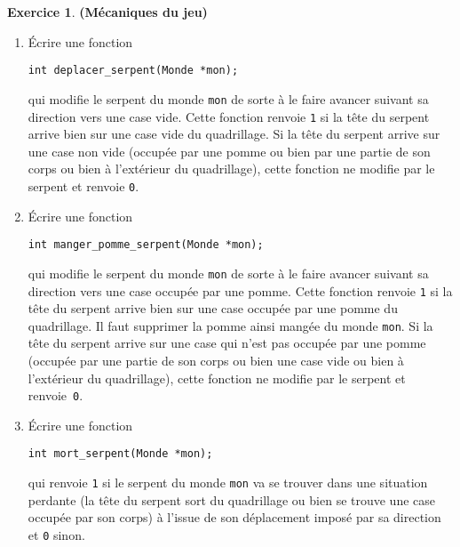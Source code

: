 \documentclass[11pt]{article}
\theoremstyle{definition}
\newtheorem{Exercice}{Exercice}
\begin{document}
\begin{Exercice} {\bf (Mécaniques du jeu)}
\begin{enumerate}
    \item Écrire une fonction
\begin{lstlisting}
int deplacer_serpent(Monde *mon);
\end{lstlisting}
    qui modifie le serpent du monde {\tt mon} de sorte à le faire avancer
    suivant sa direction vers une case vide. Cette fonction renvoie {\tt 1}
    si la tête du serpent arrive bien sur une case vide du quadrillage.
    Si la tête du serpent arrive sur une case non vide (occupée par une
    pomme ou bien par une partie de son corps ou bien à l'extérieur du
    quadrillage), cette fonction ne modifie par le serpent et renvoie {\tt 0}.
    \smallskip

    \item Écrire une fonction
\begin{lstlisting}
int manger_pomme_serpent(Monde *mon);
\end{lstlisting}
    qui modifie le serpent du monde {\tt mon} de sorte à le faire avancer
    suivant sa direction vers une case occupée par une pomme. Cette fonction
    renvoie {\tt 1} si la tête du serpent arrive bien sur une case occupée
    par une pomme du quadrillage. Il faut supprimer la pomme ainsi
    mangée du monde {\tt mon}. Si la tête du serpent arrive sur une
    case qui n'est pas occupée par une pomme (occupée par une partie
    de son corps ou bien une case vide ou bien à l'extérieur du quadrillage),
    cette fonction ne modifie par le serpent et renvoie~{\tt 0}.
    \smallskip

    \item Écrire une fonction
\begin{lstlisting}
int mort_serpent(Monde *mon);
\end{lstlisting}
    qui renvoie {\tt 1} si le serpent du monde {\tt mon} va se trouver
    dans une situation perdante (la tête du serpent sort du quadrillage
    ou bien se trouve une case occupée par son corps) à l'issue de son
    déplacement imposé par sa direction et {\tt 0} sinon.
\end{enumerate}
\end{Exercice}
\bigskip
\end{document}
